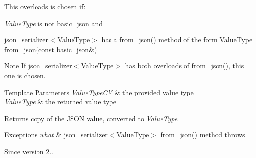 This overloads is chosen if\+:
\begin{DoxyItemize}
\item {\itshape Value\+Type} is not \mbox{\hyperlink{classnlohmann_1_1basic__json}{basic\+\_\+json}} and
\item json\+\_\+serializer$<$\+Value\+Type$>$ has a {\ttfamily from\+\_\+json()} method of the form {\ttfamily Value\+Type from\+\_\+json(const basic\+\_\+json\&)}
\end{DoxyItemize}

\begin{DoxyNote}{Note}
If json\+\_\+serializer$<$\+Value\+Type$>$ has both overloads of {\ttfamily from\+\_\+json()}, this one is chosen.
\end{DoxyNote}

\begin{DoxyTemplParams}{Template Parameters}
{\em Value\+Type\+CV} & the provided value type \\
\hline
{\em Value\+Type} & the returned value type\\
\hline
\end{DoxyTemplParams}
\begin{DoxyReturn}{Returns}
copy of the J\+S\+ON value, converted to {\itshape Value\+Type} 
\end{DoxyReturn}

\begin{DoxyExceptions}{Exceptions}
{\em what} & json\+\_\+serializer$<$\+Value\+Type$>$ {\ttfamily from\+\_\+json()} method throws\\
\hline
\end{DoxyExceptions}
\begin{DoxySince}{Since}
version 2.. 
\end{DoxySince}
\mbox{\label{classnlohmann_1_1basic__json_a4e8c9b67704826384d417cfd4b18a7bb}} 
